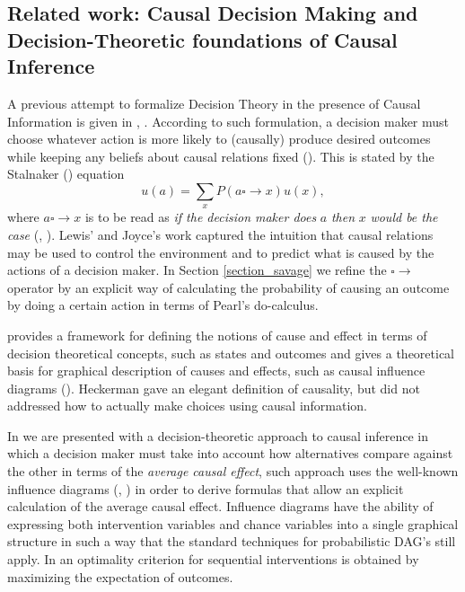 \documentclass{article}
\theoremstyle{plain}
\begin{document}
\subsection{Related work: Causal Decision Making and Decision-Theoretic foundations of Causal Inference}
A previous attempt to formalize Decision Theory in the presence of Causal Information is given in \cite{lewis1981causal}, \cite{joyce1999foundations}. According to such formulation, a decision maker must choose whatever action is more likely to (causally) produce desired outcomes while keeping any beliefs about causal relations fixed (\cite{peterson2017introduction}). This is stated by the Stalnaker (\cite{stalnaker1968}) equation
\begin{equation}
u(a)=\sum_{x} P(a \square \to x)u(x),
\end{equation}
where $a \square \to x$ is to be read as \textit{if the decision maker does} $a$ \textit{then} $x$ \textit{would be the case} (\cite{kleinberg2013causality}, \cite{peterson2017introduction}). Lewis' and Joyce's work captured the intuition that causal relations may be used to control the environment and to predict what is caused by the actions of a decision maker. In Section \ref{section_savage} we refine the $\square \to$ operator by an explicit way of calculating the probability of causing an outcome by doing a certain action in terms of Pearl's do-calculus.

\cite{heckerman1995decision} provides a framework for defining the notions of cause and effect in terms of decision theoretical concepts, such as states and outcomes and gives a theoretical basis for graphical description of causes and effects, such as causal influence diagrams (\cite{dawid2002influence}). Heckerman gave an elegant definition of causality, but did not addressed how to actually make choices using causal information.

In \cite{dawid2012decision} we are presented with a decision-theoretic approach to causal inference in which a decision maker must take into account how alternatives compare against the other in terms of the \textit{average causal effect}, such approach uses the well-known influence diagrams (\cite{dawid2002influence}, \cite{dawid2003causal}) in order to derive formulas that allow an explicit calculation of the average causal effect. Influence diagrams have the ability of expressing both intervention variables and chance variables into a single graphical structure in such a way that the standard techniques for probabilistic DAG's still apply. In \cite{dawid2008identifying} an optimality criterion for sequential interventions is obtained by maximizing the expectation of outcomes.
\end{document}
